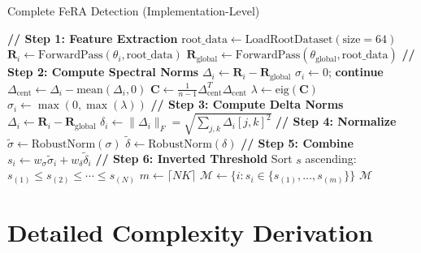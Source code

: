 \documentclass[11pt,a4paper]{article}
\begin{document}
\begin{algorithm}[H]
\caption{Complete FeRA Detection (Implementation-Level)}
\begin{algorithmic}[1]
    \State \textbf{// Step 1: Feature Extraction}
    \State $\text{root\_data} \leftarrow \text{LoadRootDataset}(\text{size}=64)$
        \State $\mathbf{R}_i \leftarrow \text{ForwardPass}(\theta_i, \text{root\_data})$ 
    \EndFor
    \State $\mathbf{R}_{\text{global}} \leftarrow \text{ForwardPass}(\theta_{\text{global}}, \text{root\_data})$
    \State
    \State \textbf{// Step 2: Compute Spectral Norms}
        \State $\Delta_i \leftarrow \mathbf{R}_i - \mathbf{R}_{\text{global}}$
            \State $\sigma_i \leftarrow 0$; \textbf{continue}
        \EndIf
        \State $\Delta_{\text{cent}} \leftarrow \Delta_i - \text{mean}(\Delta_i, 0)$
        \State $\mathbf{C} \leftarrow \frac{1}{n-1} \Delta_{\text{cent}}^T \Delta_{\text{cent}}$
        \State $\lambda \leftarrow \text{eig}(\mathbf{C})$
        \State $\sigma_i \leftarrow \max(0, \max(\lambda))$
    \EndFor
    \State
    \State \textbf{// Step 3: Compute Delta Norms}
        \State $\Delta_i \leftarrow \mathbf{R}_i - \mathbf{R}_{\text{global}}$
        \State $\delta_i \leftarrow \|\Delta_i\|_F = \sqrt{\sum_{j,k} \Delta_i[j,k]^2}$
    \EndFor
    \State
    \State \textbf{// Step 4: Normalize}
    \State $\tilde{\sigma} \leftarrow \text{RobustNorm}(\sigma)$ 
    \State $\tilde{\delta} \leftarrow \text{RobustNorm}(\delta)$
    \State
    \State \textbf{// Step 5: Combine}
        \State $s_i \leftarrow w_\sigma \tilde{\sigma}_i + w_\delta \tilde{\delta}_i$
    \EndFor
    \State
    \State \textbf{// Step 6: Inverted Threshold}
    \State Sort $s$ ascending: $s_{(1)} \leq s_{(2)} \leq \cdots \leq s_{(N)}$
    \State $m \leftarrow \lceil NK \rceil$
    \State $\mathcal{M} \leftarrow \{i : s_i \in \{s_{(1)}, \ldots, s_{(m)}\}\}$ 
    \State \Return $\mathcal{M}$
\EndFunction
\end{algorithmic}
\end{algorithm}

\section{Detailed Complexity Derivation}
\end{document}
